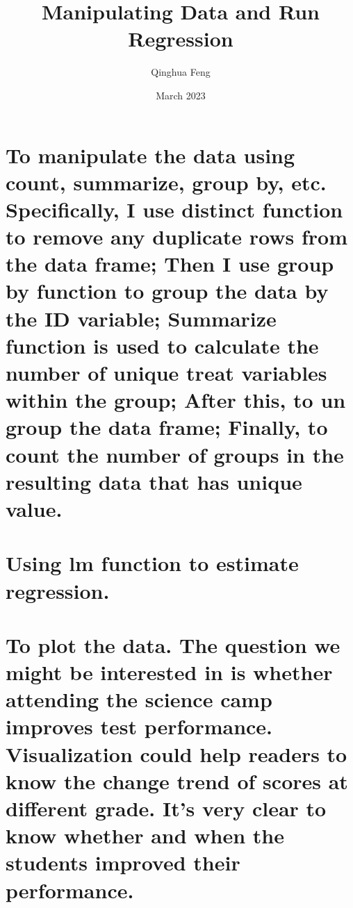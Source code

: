 \documentclass{article}
\title{Manipulating Data and Run Regression}
\author{Qinghua Feng }
\date{March 2023}
\begin{document}
\maketitle

\section{To manipulate the data using count, summarize, group by, etc. Specifically, I use distinct function to remove any duplicate rows from the data frame; Then I use group by function to group the data by the ID variable; Summarize function is used to calculate the number of unique treat variables within the group; After this, to un group the data frame; Finally, to count the number of groups in the resulting data that has unique value.}
\section{Using lm function to estimate regression.}
\section{To plot the data. The question we might be interested in is whether attending the science camp improves test performance. Visualization could help readers to know the change trend of scores at different grade. It's very clear to know whether and when the students improved their performance. }
\end{document}
